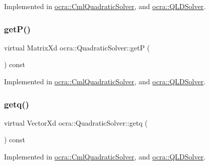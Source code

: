 Implemented in \hyperlink{classocra_1_1CmlQuadraticSolver_a963b8e8e4f099e89003be3c9cb77fa90}{ocra\+::\+Cml\+Quadratic\+Solver}, and \hyperlink{classocra_1_1QLDSolver_aa79266a95a76ec3e3c7bd6d92af1cbcb}{ocra\+::\+Q\+L\+D\+Solver}.

\hypertarget{classocra_1_1QuadraticSolver_a4dcc2768227c21262571d19c0d494935}{}\label{classocra_1_1QuadraticSolver_a4dcc2768227c21262571d19c0d494935} 
\subsubsection{\texorpdfstring{get\+P()}{getP()}}
{\footnotesize\ttfamily virtual Matrix\+Xd ocra\+::\+Quadratic\+Solver\+::getP (\begin{DoxyParamCaption}{ }\end{DoxyParamCaption}) const\hspace{0.3cm}{\ttfamily [pure virtual]}}



Implemented in \hyperlink{classocra_1_1CmlQuadraticSolver_a2d02c9af54a4456eac7e56803ee037f3}{ocra\+::\+Cml\+Quadratic\+Solver}, and \hyperlink{classocra_1_1QLDSolver_a1c710dd84d8e2ff4f87e3e20a9b656ee}{ocra\+::\+Q\+L\+D\+Solver}.

\hypertarget{classocra_1_1QuadraticSolver_a2a907a3fc7c60a7bf9e6a3403c544dcc}{}\label{classocra_1_1QuadraticSolver_a2a907a3fc7c60a7bf9e6a3403c544dcc} 
\subsubsection{\texorpdfstring{getq()}{getq()}}
{\footnotesize\ttfamily virtual Vector\+Xd ocra\+::\+Quadratic\+Solver\+::getq (\begin{DoxyParamCaption}{ }\end{DoxyParamCaption}) const\hspace{0.3cm}{\ttfamily [pure virtual]}}



Implemented in \hyperlink{classocra_1_1CmlQuadraticSolver_ac97f9655bd9a6d8564539cf7ec79c269}{ocra\+::\+Cml\+Quadratic\+Solver}, and \hyperlink{classocra_1_1QLDSolver_ae824b54386917fbd98c2fa4a3242e06a}{ocra\+::\+Q\+L\+D\+Solver}.

